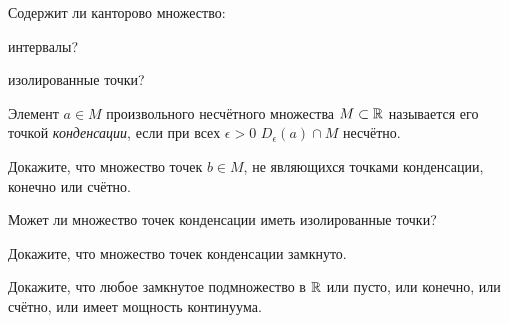 \documentclass[a4paper, 12pt, num=29]{listok}
\begin{document}
\begin{problem}
	Содержит ли канторово множество:
	\begin{probparts}
		\item интервалы?
		\item изолированные точки?
	\end{probparts}
\end{problem}
\begin{definition}
	Элемент $a \in M$ произвольного несчётного множества $M \subset \mathbb{R}$ называется его точкой \textit{конденсации}, если
	при всех $\epsilon > 0$ $D_{\epsilon}(a) \cap M$ несчётно.
\end{definition}
\begin{problem}[\hard]
	Докажите, что множество точек $b \in M$, не являющихся точками конденсации, конечно или счётно.
\end{problem}
\begin{problem}[\hard]
	Может ли множество точек конденсации иметь изолированные точки?
\end{problem}
\begin{problem}[\hard]
	Докажите, что множество точек конденсации замкнуто.
\end{problem}
\begin{problem}[\hard]
	Докажите, что любое замкнутое подмножество в $\mathbb{R}$ или пусто, или конечно, или счётно, или имеет мощность континуума.
\end{problem}
\end{document}
